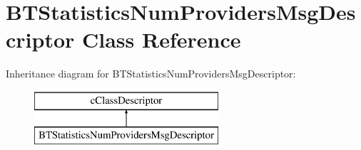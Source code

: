 \hypertarget{classBTStatisticsNumProvidersMsgDescriptor}{}\section{B\+T\+Statistics\+Num\+Providers\+Msg\+Descriptor Class Reference}
\label{classBTStatisticsNumProvidersMsgDescriptor}
Inheritance diagram for B\+T\+Statistics\+Num\+Providers\+Msg\+Descriptor\+:\begin{figure}[H]
\begin{center}
\leavevmode
\includegraphics[height=2.000000cm]{classBTStatisticsNumProvidersMsgDescriptor}
\end{center}
\end{figure}
